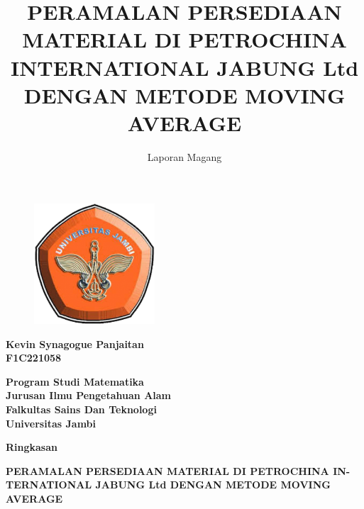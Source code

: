 \documentclass[12pt,calibri]{article}
\title{\bfseries \small PERAMALAN PERSEDIAAN MATERIAL DI PETROCHINA INTERNATIONAL 
JABUNG Ltd DENGAN METODE MOVING AVERAGE}
\author{Laporan Magang}
\date{}
\begin{document}
\maketitle

\begin{figure}[h]
    \centering
    \includegraphics[width=0.4\textwidth]{unja.png}
\end{figure}

\begin{center}
    {\bfseries  Kevin Synagogue Panjaitan} \\
    {\bfseries   F1C221058}
\end{center}
\vspace{10pt}

\begin{center}
    {\bfseries \large Program Studi Matematika }\\
    {\bfseries \large Jurusan Ilmu Pengetahuan Alam}\\
    {\bfseries \large Falkultas Sains Dan Teknologi }\\
    {\bfseries \large Universitas Jambi}
\end{center}
\vspace{10pt}


\newpage
\begin{center}
    \bfseries\Large Ringkasan 
\end{center}
\hspace*{1cm} \blindtext

\newpage
\begin{center}
    \bfseries \small PERAMALAN PERSEDIAAN MATERIAL DI PETROCHINA IN-
    TERNATIONAL JABUNG Ltd DENGAN METODE MOVING AVERAGE

\end{center}
\end{document}
